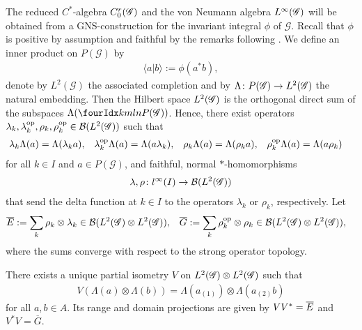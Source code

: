 The reduced $C^{*}$-algebra $C^{r}_{0}(\mathscr{G})$ and the von Neumann algebra
$L^{\infty}(\mathscr{G})$ will be obtained from a GNS-construction for the invariant
integral $\phi$ of $\mathscr{G}$. Recall that $\phi$ is positive by
assumption and faithful by the remarks following \cite[Corollary 2.16]{DCT1}.  We define an inner product on $P(\mathscr{G})$ by
\begin{align*}
  \langle a|b\rangle :=\phi(a^{*}b),
\end{align*}
denote by $L^{2}(\mathscr{G})$ the associated completion and by
$\Lambda \colon P(\mathscr{G}) \to L^{2}(\mathscr{G})$ the natural embedding.
Then the Hilbert space $L^{2}(\mathscr{G})$ is the orthogonal direct sum of the
subspaces $\Lambda(\Gr{P(\mathscr{G})}{k}{l}{m}{n})$. Hence, there exist
operators $\lambda_{k},\lambda_{k}^{\operatorname{\mathrm{op}}},\rho_{k},\rho_{k}^{\operatorname{\mathrm{op}}}\in
{\cal B}(L^{2}(\mathscr{G}))$ such that
\begin{align*}
  \lambda_{k}\Lambda(a)&= \Lambda(\lambda_{k} a), &
  \lambda^{\operatorname{\mathrm{op}}}_{k}\Lambda(a) &= \Lambda(a\lambda_{k}), &
  \rho_{k}\Lambda(a) &= \Lambda(\rho_{k}a), &
  \rho_{k}^{\operatorname{\mathrm{op}}}\Lambda(a) &= \Lambda(a\rho_{k})
\end{align*}
for all $k\in I$ and $a\in P(\mathscr{G})$, and faithful, normal $*$-homomorphisms
\begin{align} \label{eq:vn-lambda-rho}
  \lambda,\rho \colon l^{\infty}(I) \to
  {\cal B}(L^{2}(\mathscr{G}))
\end{align}
that send the delta function at $k\in I$ to the operators
$\lambda_{k}$ or $\rho_{k}$, respectively. Let
\begin{align*}
  \overline{E} &:=\sum_{k} \rho_{k} \otimes \lambda_{k} \in \mathcal{B}(L^{2}(\mathscr{G})
  \otimes L^{2}(\mathscr{G})), & \overline{G} &:=
  \sum_{k} \rho_{k}^{\operatorname{\mathrm{op}}} \otimes \rho_{k} \in \mathcal{B}(L^{2}(\mathscr{G})
  \otimes L^{2}(\mathscr{G})),
\end{align*}
where the sums converge with respect to the strong operator
topology.
\begin{Lem} \label{lemma:partial-isometry}
There exists a unique partial isometry $V$ on $L^{2}(\mathscr{G}) \otimes L^{2}(\mathscr{G})$
such that
\begin{align*}
  V(\Lambda(a) \otimes \Lambda(b)) = \Lambda(a_{(1)}) \otimes \Lambda(a_{(2)}b)
\end{align*}
for all $a,b\in A$. Its range and domain projections are given by $VV^{*} = \overline{E}$
and $V^{*}V = \overline{G}$.
\end{Lem}
